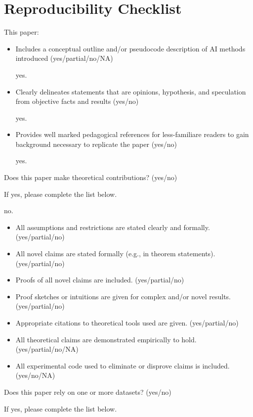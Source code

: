 \section*{Reproducibility Checklist}


This paper:

\begin{itemize}
\item Includes a conceptual outline and/or pseudocode description of AI methods introduced (yes/partial/no/NA)

yes.

\item Clearly delineates statements that are opinions, hypothesis, and speculation from objective facts and results (yes/no)

yes.

\item Provides well marked pedagogical references for less-familiare readers to gain background necessary to replicate the paper (yes/no)

yes.

\end{itemize}

\noindent Does this paper make theoretical contributions? (yes/no)

\noindent If yes, please complete the list below.

no.

\begin{itemize}
\item All assumptions and restrictions are stated clearly and formally. (yes/partial/no)
\item All novel claims are stated formally (e.g., in theorem statements). (yes/partial/no)
\item Proofs of all novel claims are included. (yes/partial/no)
\item Proof sketches or intuitions are given for complex and/or novel results. (yes/partial/no)
\item Appropriate citations to theoretical tools used are given. (yes/partial/no)
\item All theoretical claims are demonstrated empirically to hold. (yes/partial/no/NA)
\item All experimental code used to eliminate or disprove claims is included. (yes/no/NA)
\end{itemize}

\noindent Does this paper rely on one or more datasets? (yes/no)

\noindent If yes, please complete the list below.

